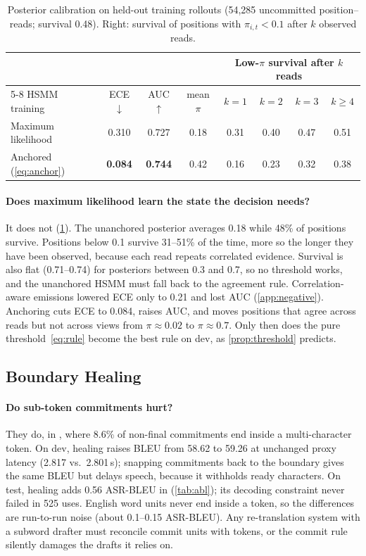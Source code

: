 \begin{table}[t]
\centering
\caption{Posterior calibration on held-out training rollouts (54{,}285 uncommitted position--reads; survival 0.48). Right: survival of positions with $\pi_{i,t} < 0.1$ after $k$ observed reads.}
\label{tab:calib}
\small
\setlength{\tabcolsep}{4pt}
\begin{tabular}{lccccccc}
\toprule
& & & & \multicolumn{4}{c}{Low-$\pi$ survival after $k$ reads} \\
\cmidrule(lr){5-8}
HSMM training & ECE$\downarrow$ & AUC$\uparrow$ & mean $\pi$ & $k{=}1$ & $k{=}2$ & $k{=}3$ & $k{\ge}4$ \\
\midrule
Maximum likelihood & 0.310 & 0.727 & 0.18 & 0.31 & 0.40 & 0.47 & 0.51 \\
Anchored (\cref{eq:anchor}) & \textbf{0.084} & \textbf{0.744} & 0.42 & 0.16 & 0.23 & 0.32 & 0.38 \\
\bottomrule
\end{tabular}
\end{table}

\paragraph{Does maximum likelihood learn the state the decision needs?}
It does not (\cref{tab:calib}).
The unanchored posterior averages 0.18 while 48\% of positions survive.
Positions below 0.1 survive 31--51\% of the time, more so the longer they have been observed, because each read repeats correlated evidence.
Survival is also flat (0.71--0.74) for posteriors between 0.3 and 0.7, so no threshold works, and the unanchored HSMM must fall back to the agreement rule.
Correlation-aware emissions lowered ECE only to 0.21 and lost AUC (\cref{app:negative}).
Anchoring cuts ECE to 0.084, raises AUC, and moves positions that agree across reads but not across views from $\pi \approx 0.02$ to $\pi \approx 0.7$.
Only then does the pure threshold~\eqref{eq:rule} become the best rule on dev, as \cref{prop:threshold} predicts.

\subsection{Boundary Healing}
\label{sec:healres}

\paragraph{Do sub-token commitments hurt?}
They do, in \enzh{}, where 8.6\% of non-final commitments end inside a multi-character token.
On dev, healing raises BLEU from 58.62 to 59.26 at unchanged proxy latency (2.817 vs.\ 2.801\,s); snapping commitments back to the boundary gives the same BLEU but delays speech, because it withholds ready characters.
On test, healing adds 0.56 ASR-BLEU in \enzh{} (\cref{tab:abl}); its decoding constraint never failed in 525 uses.
English word units never end inside a token, so the \zhen{} differences are run-to-run noise (about 0.1--0.15 ASR-BLEU).
Any re-translation system with a subword drafter must reconcile commit units with tokens, or the commit rule silently damages the drafts it relies on.

